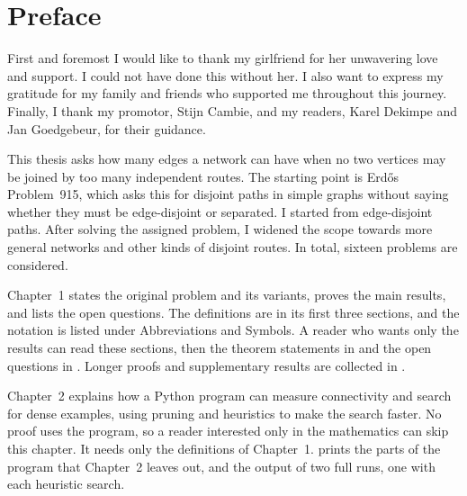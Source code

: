 




\hypersetup{pageanchor=false}
\makefacultycover
\makecopyrightpage
\hypersetup{pageanchor=true}

\setcounter{page}{1}



\chapter*{Preface}

First and foremost I would like to thank my girlfriend for her unwavering love and support.
I could not have done this without her.
I also want to express my gratitude for my family and friends who supported me throughout this journey.
Finally, I thank my promotor, Stijn Cambie, and my readers, Karel Dekimpe and Jan Goedgebeur, for their guidance.

This thesis asks how many edges a network can have when no two vertices may be joined by too many independent routes.
The starting point is Erd\H{o}s Problem~915, which asks this for disjoint paths in simple graphs without saying whether they must be edge-disjoint or separated. I started from edge-disjoint paths.
After solving the assigned problem, I widened the scope towards more general networks and other kinds of disjoint routes.
In total, sixteen problems are considered.

Chapter~1 states the original problem and its variants, proves the main results, and lists the open questions.
The definitions are in its first three sections, and the notation is listed under Abbreviations and Symbols.
A reader who wants only the results can read these sections, then the theorem statements in  and the open questions in .
Longer proofs and supplementary results are collected in .

Chapter~2 explains how a Python program can measure connectivity and search for dense examples, using pruning and heuristics to make the search faster.
No proof uses the program, so a reader interested only in the mathematics can skip this chapter.
It needs only the definitions of Chapter~1.
 prints the parts of the program that Chapter~2 leaves out, and the output of two full runs, one with each heuristic search.

